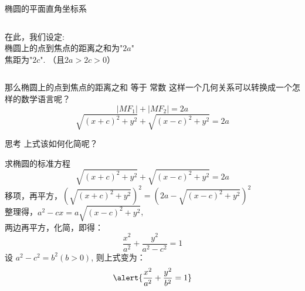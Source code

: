 \documentclass{beamer}
\begin{document}
    \begin{frame}{\qquad 椭圆的平面直角坐标系}

      \begin{columns}[onlytextwidth]
          在此，我们设定: \\
          椭圆上的点到焦点的\alert{距离之和}为"\alert{$2a$}"\\ \pause
           \alert{焦距}为"\alert{$2c$}". （且\alert{$2a > 2c > 0$}）\pause

      \end{columns}

      那么椭圆上的点到焦点的\alert{距离之和} \textcolor{rh}{等于} \alert{常数} 这样一个几何关系可以转换成一个怎样的数学语言呢？\pause
      \[ |MF_1|+|MF_2|=2a \] \pause
      \[ \sqrt{(x+c)^2+y^2} + \sqrt{(x-c)^2+y^2} = 2a \] \pause
      \begin{block}{思考}
        上式该如何化简呢？
      \end{block}

    \end{frame}

    \begin{frame}{\qquad 求椭圆的标准方程}
        \[ \sqrt{(x+c)^2+y^2} + \sqrt{(x-c)^2+y^2} = 2a \] \pause \vspace{7pt}
        移项，再平方，$ (\sqrt{(x+c)^2+y^2})^2 = (2a - \sqrt{(x-c)^2+y^2})^2 $ \\ \vspace{7pt} \pause
        整理得，$ a^2-cx = a\sqrt{(x-c)^2+y^2} $, \vspace{7pt}\\ \pause
        两边再平方，化简，即得：
        \[ \frac{x^2}{a^2} + \frac{y^2}{a^2-c^2} = 1 \] \pause
        设 $ a^2-c^2 = b^2 (b>0) $, \pause 则上式变为：
        \[ \alert{\frac{x^2}{a^2} + \frac{y^2}{b^2} = 1} \]
    \end{frame}
\end{document}
